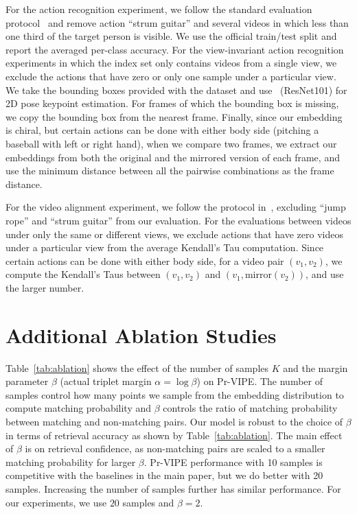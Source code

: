  For the action recognition experiment, we follow the standard evaluation protocol~\cite{xia2012view} and remove action ``strum guitar'' and several videos in which less than one third of the target person is visible. We use the official train/test split and report the averaged per-class accuracy. For the view-invariant action recognition experiments in which the index set only contains videos from a single view, we exclude the actions that have zero or only one sample under a particular view. We take the bounding boxes provided with the dataset and use~\cite{papandreou2017towards} (ResNet101) for 2D pose keypoint estimation. For frames of which the bounding box is missing, we copy the bounding box from the nearest frame. Finally, since our embedding is chiral, but certain actions can be done with either body side (pitching a baseball with left or right hand), when we compare two frames, we extract our embeddings from both the original and the mirrored version of each frame, and use the minimum distance between all the pairwise combinations as the frame distance.

For the video alignment experiment, we follow the protocol in~\cite{dwibedi2019temporal}, excluding ``jump rope'' and ``strum guitar'' from our evaluation. For the evaluations between videos under only the same or different views, we exclude actions that have zero videos under a particular view from the average Kendall's Tau computation. Since certain actions can be done with either body side, for a video pair $(v_1,v_2)$, we compute the Kendall's Taus between $(v_1,v_2)$ and $(v_1,\text{mirror}(v_2))$, and use the larger number.

\section{Additional Ablation Studies}\label{sec:ablation}

 Table~\ref{tab:ablation} shows the effect of the number of samples $K$ and the margin parameter $\beta$ (actual triplet margin $\alpha=\log\beta$) on Pr-VIPE. The number of samples control how many points we sample from the embedding distribution to compute matching probability and $\beta$ controls the ratio of matching probability between matching and non-matching pairs. Our model is robust to the choice of $\beta$ in terms of retrieval accuracy as shown by Table~\ref{tab:ablation}. The main effect of $\beta$ is on retrieval confidence, as non-matching pairs are scaled to a smaller matching probability for larger $\beta$. Pr-VIPE performance with 10 samples is competitive with the baselines in the main paper, but we do better with 20 samples. Increasing the number of samples further has similar performance. For our experiments, we use $20$ samples and $\beta = 2$.

